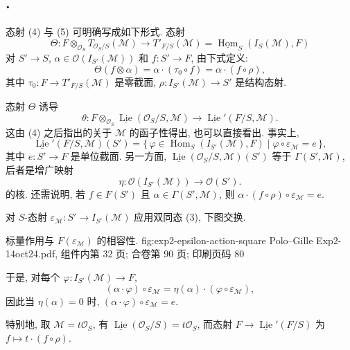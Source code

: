 \subsection*{.}
态射 (4) 与 (5) 可明确写成如下形式. 态射
\[
 \Theta:F\otimes_{\mathcal O_S}T_{\mathcal O_S/S}(\mathcal M)
 \longrightarrow T'_{F/S}(\mathcal M)
 =\underline{\operatorname{Hom}}_S(I_S(\mathcal M),F)
\]
对 \(S'\to S\), \(\alpha\in\mathcal O(I_{S'}(\mathcal M))\)
和 \(f:S'\to F\), 由下式定义:
\[
 \Theta(f\otimes\alpha)
 =\alpha\cdot(\tau_0\circ f)
 =\alpha\cdot(f\circ\rho),
\]
其中 \(\tau_0:F\to T'_{F/S}(\mathcal M)\) 是零截面,
\(\rho:I_{S'}(\mathcal M)\to S'\) 是结构态射.

态射 \(\Theta\) 诱导
\[
 \theta:F\otimes_{\mathcal O_S}
 \underline{\operatorname{Lie}}(\mathcal O_S/S,\mathcal M)
 \longrightarrow
 \underline{\operatorname{Lie}}'(F/S,\mathcal M).
\]
这由 (4) 之后指出的关于 \(\mathcal M\) 的函子性得出, 也可以直接看出. 事实上,
\[
 \underline{\operatorname{Lie}}'(F/S,\mathcal M)(S')
 =\{\,\varphi\in\operatorname{Hom}_S(I_{S'}(\mathcal M),F)
       \mid \varphi\circ\varepsilon_{\mathcal M}=e\,\},
\]
其中 \(e:S'\to F\) 是单位截面. 另一方面,
\(\underline{\operatorname{Lie}}(\mathcal O_S/S,\mathcal M)(S')\)
等于 \(\Gamma(S',\mathcal M)\), 后者是增广映射
\[
 \eta:\mathcal O(I_{S'}(\mathcal M))\longrightarrow\mathcal O(S').
\]
的核. 还需说明, 若 \(f\in F(S')\) 且 \(\alpha\in\Gamma(S',\mathcal M)\),
则 \(\alpha\cdot(f\circ\rho)\circ\varepsilon_{\mathcal M}=e\).

对 \(S\)-态射 \(\varepsilon_{\mathcal M}:S'\to I_{S'}(\mathcal M)\)
应用双同态 (3), 下图交换.

  {标量作用与 \(F(\varepsilon_{\mathcal M})\) 的相容性.}
  {fig:exp2-epsilon-action-square}
  {Polo--Gille Exp2-14oct24.pdf, 组件内第 32 页; 合卷第 90 页; 印刷页码 80}

于是, 对每个 \(\varphi:I_{S'}(\mathcal M)\to F\),
\[
 (\alpha\cdot\varphi)\circ\varepsilon_{\mathcal M}
 =\eta(\alpha)\cdot(\varphi\circ\varepsilon_{\mathcal M}),
\]
因此当 \(\eta(\alpha)=0\) 时,
\((\alpha\cdot\varphi)\circ\varepsilon_{\mathcal M}=e\).

特别地, 取 \(\mathcal M=t\mathcal O_S\), 有
\(\underline{\operatorname{Lie}}(\mathcal O_S/S)=t\mathcal O_S\),
而态射 \(F\to\underline{\operatorname{Lie}}'(F/S)\) 为
\(f\mapsto t\cdot(f\circ\rho)\).

